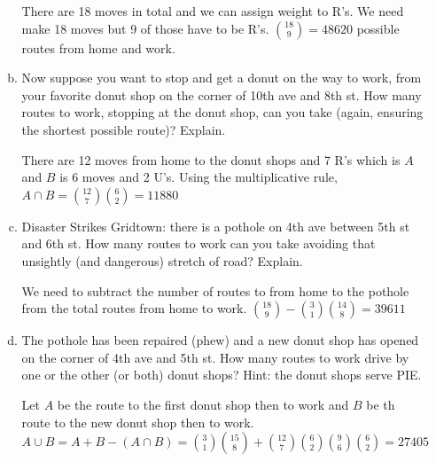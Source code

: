 \documentclass[11pt, a4paper]{article}
\begin{document}
\begin{enumerate}
\begin{enumerate}[(a)]
                There are 18 moves in total and we can assign weight to R's. We need make 18 moves but 9 of those have to be R's. ${18\choose  9} = 48620$ possible routes from home and work.

                \item Now suppose you want to stop and get a donut on the way to work, from your favorite donut shop on the corner of 10th ave and 8th st. How many routes to work, stopping at the donut shop, can you take (again, ensuring the shortest possible route)? Explain.

                    There are 12 moves from home to the donut shops and 7 R's which is $A$ and $B$ is 6 moves and 2 U's. Using the multiplicative rule, $A\cap B = {12\choose 7}{6\choose 2} = 11880$

                \item Disaster Strikes Gridtown: there is a pothole on 4th ave between 5th st and 6th st. How many routes to work can you take avoiding that unsightly (and dangerous) stretch of road? Explain.

                    We need to subtract the number of routes to from home to the pothole from the total routes from home to work. ${18\choose 9} - {3\choose 1}{14\choose 8} = 39611$

                \item The pothole has been repaired (phew) and a new donut shop has opened on the corner of 4th ave and 5th st. How many routes to work drive by one or the other (or both) donut shops? Hint: the donut shops serve PIE.

                    Let $A$ be the route to the first donut shop then to work and $B$ be th route to the new donut shop then to work. $A\cup B = A + B - (A\cap B) = {3\choose 1}{15\choose 8} + {12\choose 7}{6\choose 2}{9\choose 6}{6\choose 2} = 27405$

            \end{enumerate}

    \end{enumerate}

	
\end{document}
